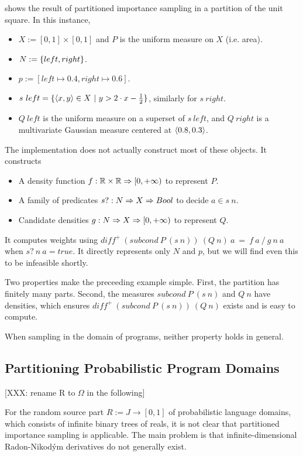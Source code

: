\begin{example}
 shows the result of partitioned importance sampling in a partition of the unit square.
In this instance,
\begin{itemize}
	\item $X := [0,1] \times [0,1]$ and $P$ is the uniform measure on $X$ (i.e. area).
	\item $N := \{{left,right}\}$.
	\item $p := [left \mapsto 0.4, right \mapsto 0.6]$.
	\item $s~left = \lbrace {\langle{x,y}\rangle \in X} \ \lvert\ {y > 2 \cdot x - \frac{1}{2}} \rbrace$, similarly for $s~right$.
	\item $Q~left$ is the uniform measure on a superset of $s~left$, and $Q~right$ is a multivariate Gaussian measure centered at $\langle{0.8,0.3}\rangle$.
\end{itemize}
The implementation does not actually construct most of these objects. It constructs
\begin{itemize}
	\item A density function $f : \mathbb{R} \times \mathbb{R} \Rightarrow [0,+\infty)$ to represent $P$.
	\item A family of predicates $s? : N \Rightarrow X \Rightarrow Bool$ to decide $a \in s~n$.
	\item Candidate densities $g : N \Rightarrow X \Rightarrow [0,+\infty)$ to represent $Q$.
\end{itemize}
It computes weights using $diff^+~(subcond~P~(s~n))~(Q~n)~a\ =\ f~a~{/}~g~n~a$ when $s?~n~a = true$.
It directly represents only $N$ and $p$, but we will find even this to be infeasible shortly.
\exampleqed
\end{example}

Two properties make the preceeding example simple.
First, the partition has finitely many parts.
Second, the measures $subcond~P~(s~n)$ and $Q~n$ have densities, which ensures $diff^+~(subcond~P~(s~n))~(Q~n)$ exists and is easy to compute.

When sampling in the domain of programs, neither property holds in general.

\subsection{Partitioning Probabilistic Program Domains}

[XXX: rename R to $\Omega$ in the following]

For the random source part $R := J \to [0,1]$ of probabilistic language domains, which consists of infinite binary trees of reals, it is not clear that partitioned importance sampling is applicable.
The main problem is that infinite-dimensional Radon-Nikod\'ym derivatives do not generally exist.

